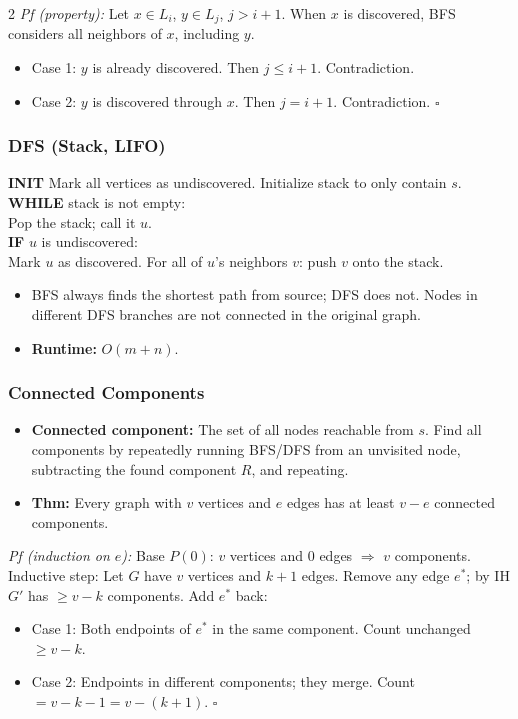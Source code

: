 \documentclass[9pt]{article}
\begin{document}
\begin{multicols}{2}
\textit{Pf (property):} Let $x\in L_i$, $y\in L_j$, $j>i+1$. When $x$ is discovered, BFS considers all neighbors of $x$, including $y$.
\begin{itemize}
  \item Case 1: $y$ is already discovered. Then $j\le i+1$. Contradiction.
  \item Case 2: $y$ is discovered through $x$. Then $j=i+1$. Contradiction. $\square$
\end{itemize}

\subsubsection*{DFS (Stack, LIFO)}

\textbf{INIT} Mark all vertices as undiscovered. Initialize stack to only contain $s$.\\
\textbf{WHILE} stack is not empty:\\
\hspace*{8pt}Pop the stack; call it $u$.\\
\hspace*{8pt}\textbf{IF} $u$ is undiscovered:\\
\hspace*{16pt}Mark $u$ as discovered. For all of $u$'s neighbors $v$: push $v$ onto the stack.
\begin{itemize}
  \item BFS always finds the shortest path from source; DFS does not. Nodes in different DFS branches are not connected in the original graph.
  \item \textbf{Runtime:} $O(m+n)$.
\end{itemize}

\subsubsection*{Connected Components}

\begin{itemize}
  \item \textbf{Connected component:} The set of all nodes reachable from $s$. Find all components by repeatedly running BFS/DFS from an unvisited node, subtracting the found component $R$, and repeating.
  \item \textbf{Thm:} Every graph with $v$ vertices and $e$ edges has at least $v-e$ connected components.
\end{itemize}

\textit{Pf (induction on $e$):} Base $P(0)$: $v$ vertices and 0 edges $\Rightarrow$ $v$ components. Inductive step: Let $G$ have $v$ vertices and $k+1$ edges. Remove any edge $e^*$; by IH $G'$ has $\ge v-k$ components. Add $e^*$ back:
\begin{itemize}
  \item Case 1: Both endpoints of $e^*$ in the same component. Count unchanged $\ge v-k$.
  \item Case 2: Endpoints in different components; they merge. Count $=v-k-1=v-(k+1)$. $\square$
\end{itemize}


\end{multicols}
\end{document}
